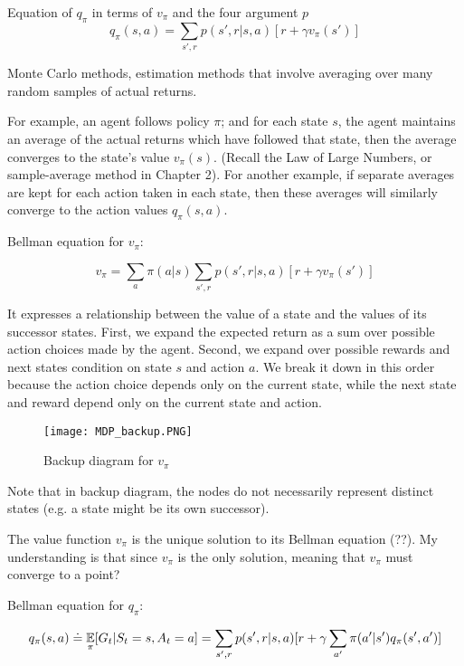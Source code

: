 \documentclass[sutton_barto_notes.tex]{subfiles}
\begin{document}
Equation of $q_\pi$ in terms of $v_\pi$ and the four argument $p$
$$ q_\pi(s,a) = \sum_{s', r} p(s',r|s,a) [r+\gamma v_\pi(s')] $$

\begin{definition}
Monte Carlo methods, estimation methods that involve averaging over many random samples of actual returns.
\end{definition}

For example, an agent follows policy $\pi$; and for each state $s$, the agent maintains an average of the actual returns which have followed that state, then the average converges to the state's value $v_\pi(s)$. (Recall the Law of Large Numbers, or sample-average method in Chapter 2).
For another example, if separate averages are kept for each action taken in each state, then these averages will similarly converge to the action values $q_\pi(s,a)$.

\begin{definition}
Bellman equation for $v_\pi$:

$$ v_\pi = \sum_a \pi(a|s) \sum_{s',r} p(s',r|s,a) [r+ \gamma v_\pi(s')] $$
\end{definition}

It expresses a relationship between the value of a state and the values of its successor states. First, we expand the expected return as a sum over possible action choices made by the agent. Second, we expand over possible rewards and next states condition on state $s$ and action $a$. We break it down in this order because the action choice depends only on the current state, while the next state and reward depend only on the current state and action. 

\begin{figure}[!h]
  \centering
  \texttt{[image: MDP\_backup.PNG]}
  \caption{Backup diagram for $v_\pi$}
  \label{fig:MDP_backup}
\end{figure}
Note that in backup diagram, the nodes do not necessarily represent distinct states (e.g. a state might be its own successor).

The value function $v_\pi$ is the unique solution to its Bellman equation (??). My understanding is that since $v_\pi$ is the only solution, meaning that $v_\pi$ must converge to a point?

\begin{definition}
Bellman equation for $q_\pi$:

$$ q_\pi(s,a) \doteq \operatorname*{\mathbb{E}}_\pi [G_t | S_t = s, A_t = a] = \sum_{s',r} p(s',r|s,a)[r+\gamma \sum_{a'} \pi(a'|s')q_\pi (s',a')] $$
\end{definition}
\end{document}
